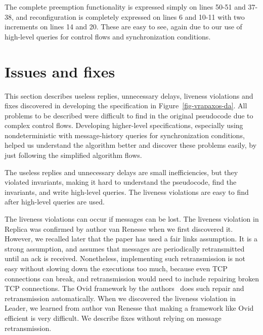 \documentclass[11pt]{article}
\newcommand{\mysec}[1]{\section{#1}}
\begin{document}
The complete preemption functionality is expressed simply on lines 50-51
and 37-38, and reconfiguration is completely expressed on lines 6 and 10-11
with two increments on lines 14 and 20.  These are easy to see, again due
to our use of high-level queries for control flows and synchronization
conditions.


\mysec{Issues and fixes}
\label{sec-fixes}

This section describes useless replies, unnecessary delays, liveness
violations and fixes discovered in developing the specification in
Figure~\ref{fig-vrapaxos-da}.
All problems to be described were difficult to find in the original
pseudocode due to complex control flows.  Developing higher-level
specifications, especially 
using nondeterministic  with
message-history queries for
synchronization conditions, 
helped us understand the algorithm better and
discover these problems easily, by just following the simplified
algorithm flows.

The useless replies and unnecessary delays are small inefficiencies, 
but they violated invariants, making it hard to understand the pseudocode,
find the invariants, and write high-level queries.  
The liveness violations %
are easy to find after high-level queries are used.

The liveness violations can occur if messages can be lost.  The liveness
violation in Replica was confirmed by author 
van Renesse when we first discovered it.  However, we recalled later that
the paper has used a fair links assumption.  It is a strong assumption,
and assumes that messages are
periodically retransmitted until an ack is received.  Nonetheless,
implementing such retransmission is not easy without slowing down the
executions too much, because even TCP connections can break, and
retransmission would need to include repairing broken TCP connections.  The
Ovid framework by the authors~\cite{ovid2016} does such repair and
retransmission automatically.  When we discovered the liveness violation in
Leader, we learned from author van Renesse that making a framework like
Ovid efficient is very difficult.  We describe fixes without relying on 
message retransmission.
\end{document}
